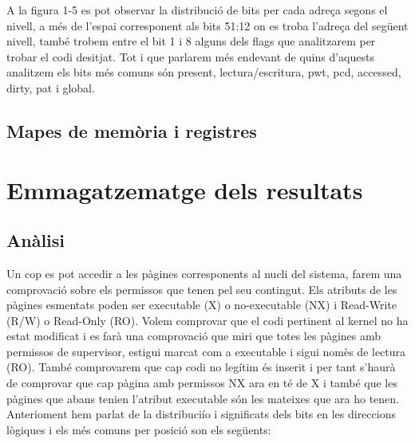 ﻿\documentclass[10pt,a4paper,twocolumn,twoside]{article}
\begin{document}
A la figura 1-5 es pot observar la distribució de bits per cada adreça segons el nivell, a més de l’espai corresponent als bits 51:12 on es troba l’adreça del següent nivell, també trobem entre el bit 1 i 8 alguns dels flags que analitzarem per trobar el codi desitjat. Tot i que parlarem més endevant de quins d’aquests analitzem els bits més comuns són present, lectura/escritura, pwt, pcd, accessed, dirty, pat i global.



\subsection{Mapes de memòria i registres}

\section{Emmagatzematge dels resultats}
\subsection{Anàlisi}
Un cop es pot accedir a les pàgines corresponents al nucli del sistema, farem una comprovació sobre els permissos que tenen pel seu contingut. Els atributs de les pàgines esmentats poden ser executable (X) o no-executable (NX) i Read-Write (R/W) o Read-Only (RO).
Volem comprovar que el codi pertinent al kernel no ha estat modificat i es farà una comprovació que miri que totes les pàgines amb permissos de supervisor, estigui marcat com a executable i sigui nomès de lectura (RO). També comprovarem que cap codi no legítim és inserit i per tant s’haurà de comprovar que cap pàgina amb permissos NX ara en té de X i també que les pàgines que abans tenien l’atribut executable són les mateixes que ara ho tenen.
Anterioment hem parlat de la distribuciío i significats dels bits en les direccions lògiques i els més comuns per posició son els següents:

\begin{table}
\caption{Taula d'exemple}
\label{tab:senzilla}
\begin{center}
\end{center}
\end{table}
\end{document}
